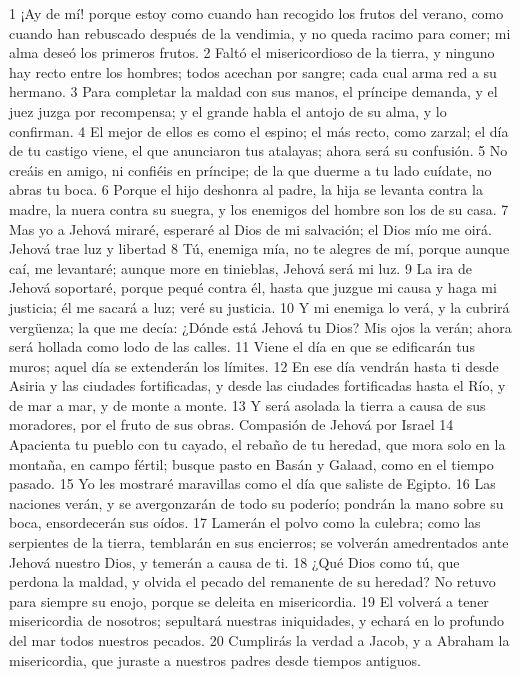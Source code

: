 1 ¡Ay de mí! porque estoy como cuando han recogido los frutos del verano, como cuando han rebuscado después de la vendimia, y no queda racimo para comer; mi alma deseó los primeros frutos.
2 Faltó el misericordioso de la tierra, y ninguno hay recto entre los hombres; todos acechan por sangre; cada cual arma red a su hermano.
3 Para completar la maldad con sus manos, el príncipe demanda, y el juez juzga por recompensa; y el grande habla el antojo de su alma, y lo confirman.
4 El mejor de ellos es como el espino; el más recto, como zarzal; el día de tu castigo viene, el que anunciaron tus atalayas; ahora será su confusión.
5 No creáis en amigo, ni confiéis en príncipe; de la que duerme a tu lado cuídate, no abras tu boca.
6 Porque el hijo deshonra al padre, la hija se levanta contra la madre, la nuera contra su suegra, y los enemigos del hombre son los de su casa. 
7 Mas yo a Jehová miraré, esperaré al Dios de mi salvación; el Dios mío me oirá.
Jehová trae luz y libertad
8 Tú, enemiga mía, no te alegres de mí, porque aunque caí, me levantaré; aunque more en tinieblas, Jehová será mi luz.
9 La ira de Jehová soportaré, porque pequé contra él, hasta que juzgue mi causa y haga mi justicia; él me sacará a luz; veré su justicia.
10 Y mi enemiga lo verá, y la cubrirá vergüenza; la que me decía: ¿Dónde está Jehová tu Dios? Mis ojos la verán; ahora será hollada como lodo de las calles.
11 Viene el día en que se edificarán tus muros; aquel día se extenderán los límites.
12 En ese día vendrán hasta ti desde Asiria y las ciudades fortificadas, y desde las ciudades fortificadas hasta el Río, y de mar a mar, y de monte a monte.
13 Y será asolada la tierra a causa de sus moradores, por el fruto de sus obras.
Compasión de Jehová por Israel
14 Apacienta tu pueblo con tu cayado, el rebaño de tu heredad, que mora solo en la montaña, en campo fértil; busque pasto en Basán y Galaad, como en el tiempo pasado.
15 Yo les mostraré maravillas como el día que saliste de Egipto.
16 Las naciones verán, y se avergonzarán de todo su poderío; pondrán la mano sobre su boca, ensordecerán sus oídos.
17 Lamerán el polvo como la culebra; como las serpientes de la tierra, temblarán en sus encierros; se volverán amedrentados ante Jehová nuestro Dios, y temerán a causa de ti.
18 ¿Qué Dios como tú, que perdona la maldad, y olvida el pecado del remanente de su heredad? No retuvo para siempre su enojo, porque se deleita en misericordia.
19 El volverá a tener misericordia de nosotros; sepultará nuestras iniquidades, y echará en lo profundo del mar todos nuestros pecados.
20 Cumplirás la verdad a Jacob, y a Abraham la misericordia, que juraste a nuestros padres desde tiempos antiguos.

